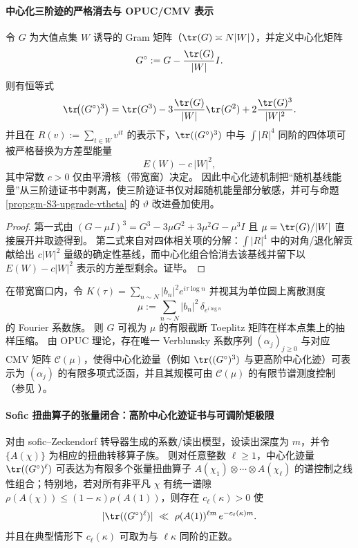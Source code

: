 \paragraph{中心化三阶迹的严格消去与 OPUC/CMV 表示}
\begin{proposition}\label{prop:gm-centered-trace3-energy-variance}
令 \(G\) 为大值点集 \(W\) 诱导的 Gram 矩阵（\(\tr(G)\asymp N|W|\)），并定义中心化矩阵
\[
G^\circ:=G-\frac{\tr(G)}{|W|}I.
\]
则有恒等式
\[
\tr\!\bigl((G^\circ)^3\bigr)
=\tr(G^3)-3\frac{\tr(G)}{|W|}\tr(G^2)+2\frac{\tr(G)^3}{|W|^2}.
\]
并且在 \(R(v):=\sum_{t\in W}v^{it}\) 的表示下，\(\tr((G^\circ)^3)\) 中与 \(\int |R|^4\) 同阶的四体项可被严格替换为方差型能量
\[
E(W)-c\,|W|^2,
\]
其中常数 \(c>0\) 仅由平滑核（带宽窗）决定。
因此中心化迹机制把“随机基线能量”从三阶迹证书中剥离，使三阶迹证书仅对超随机能量部分敏感，并可与命题 \ref{prop:gm-S3-upgrade-vtheta} 的 \(\vartheta\) 改进叠加使用。
\end{proposition}

\begin{proof}
第一式由 \((G-\mu I)^3=G^3-3\mu G^2+3\mu^2G-\mu^3I\) 且 \(\mu=\tr(G)/|W|\) 直接展开并取迹得到。
第二式来自对四体相关项的分解：\(\int |R|^4\) 中的对角/退化解贡献给出 \(c|W|^2\) 量级的确定性基线，而中心化组合恰消去该基线并留下以 \(E(W)-c|W|^2\) 表示的方差型剩余。证毕。
\end{proof}

\begin{proposition}\label{prop:gm-toeplitz-cmv-verblunsky-embedding}
在带宽窗口内，令
\(
K(\tau)=\sum_{n\sim N}|b_n|^2 e^{i\tau\log n}
\)
并视其为单位圆上离散测度
\[
\mu:=\sum_{n\sim N}|b_n|^2\,\delta_{e^{i\log n}}
\]
的 Fourier 系数族。
则 \(G\) 可视为 \(\mu\) 的有限截断 Toeplitz 矩阵在样本点集上的抽样压缩。
由 OPUC 理论，存在唯一 Verblunsky 系数序列 \((\alpha_j)_{j\ge 0}\) 与对应 CMV 矩阵 \(\mathcal{C}(\mu)\)，使得中心化迹量（例如 \(\tr((G^\circ)^3)\) 与更高阶中心化迹）可表示为 \((\alpha_j)\) 的有限多项式泛函，并且其规模可由 \(\mathcal{C}(\mu)\) 的有限节谱测度控制（参见 \cite{CanteroMoralVelazquez2003CMV,Simon2005OPUC1}）。
\end{proposition}

\paragraph{Sofic 扭曲算子的张量闭合：高阶中心化迹证书与可调阶矩极限}
\begin{theorem}\label{thm:gm-tensor-twist-centered-moments}
对由 sofic--Zeckendorf 转导器生成的系数/读出模型，设读出深度为 \(m\)，并令 \(\{A(\chi)\}\) 为相应的扭曲转移算子族。
则对任意整数 \(\ell\ge 1\)，中心化迹量 \(\tr((G^\circ)^\ell)\) 可表达为有限多个张量扭曲算子
\(
A(\chi_1)\otimes\cdots\otimes A(\chi_\ell)
\)
的谱控制之线性组合；特别地，若对所有非平凡 \(\chi\) 有统一谱隙
\(
\rho(A(\chi))\le (1-\kappa)\rho(A(1))
\)，则存在 \(c_\ell(\kappa)>0\) 使
\[
|\tr((G^\circ)^\ell)|\ \ll\ \rho(A(1))^{\ell m}\,e^{-c_\ell(\kappa)m}.
\]
并且在典型情形下 \(c_\ell(\kappa)\) 可取为与 \(\ell\kappa\) 同阶的正数。
\end{theorem}

